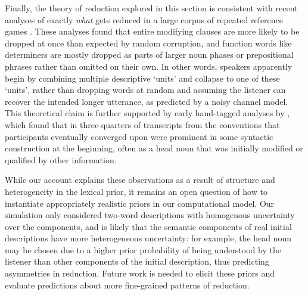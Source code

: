 Finally, the theory of reduction explored in this section is consistent with recent analyses of exactly \emph{what} gets reduced in a large corpus of repeated reference games \cite{hawkins2020characterizing}.
These analyses found that entire modifying clauses are more likely to be dropped at once than expected by random corruption, and function words like determiners are mostly dropped as parts of larger noun phases or prepositional phrases rather than omitted on their own.
In other words, speakers apparently begin by combining multiple descriptive `units' and collapse to one of these `units', rather than dropping words at random and assuming the listener can recover the intended longer utterance, as predicted by a noisy channel model.
This theoretical claim is further supported by early hand-tagged analyses by , which found that in three-quarters of transcripts from  the conventions that participants eventually converged upon were prominent in some syntactic construction at the beginning, often as a head noun that was initially modified or qualified by other information. 

While our account explains these observations as a result of structure and heterogeneity in the lexical prior, it remains an open question of how to instantiate appropriately realistic priors in our computational model. 
Our simulation only considered two-word descriptions with homogenous uncertainty over the components, and is likely that the semantic components of real initial descriptions have more heterogeneous uncertainty: for example, the head noun may be chosen due to a higher prior probability of being understood by the listener than other components of the initial description, thus predicting asymmetries in reduction. 
Future work is needed to elicit these priors and evaluate predictions about more fine-grained patterns of reduction.






